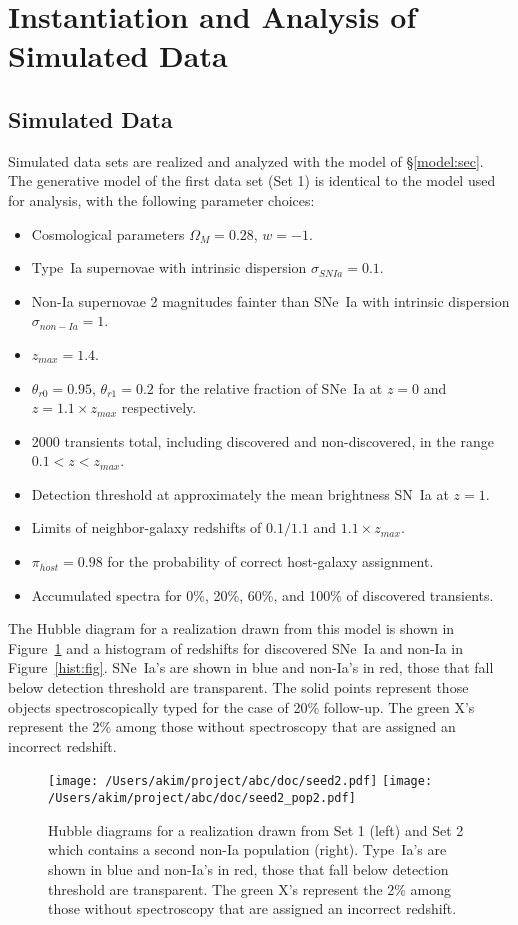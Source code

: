 \documentclass[preprint,3p]{elsarticle}
\begin{document}
\section{Instantiation and Analysis of Simulated Data}
\subsection{Simulated Data}
Simulated data sets are realized and analyzed with the model of
 \S\ref{model:sec}.  The generative model of the first data set (Set 1) is
 identical to the model used for analysis, with the following parameter choices:
\begin{itemize}
\item Cosmological parameters $\Omega_M=0.28$, $w=-1$.
\item Type~Ia supernovae with intrinsic dispersion $\sigma_{SNIa}=0.1$.
\item Non-Ia supernovae 2 magnitudes fainter than SNe~Ia with intrinsic
dispersion $\sigma_{non-Ia}=1$.
\item $z_{max}=1.4$.
\item $\theta_{r0}=0.95$, $\theta_{r1}=0.2$ for the relative fraction of SNe~Ia
at $z=0$ and $z=1.1 \times z_{max}$ respectively.
\item 2000 transients total, including discovered and non-discovered,
in the range $0.1<z<z_{max}$.
\item Detection threshold at approximately the mean brightness SN~Ia at $z=1$.
\item Limits of neighbor-galaxy redshifts of $0.1/1.1$ and $1.1\times z_{max}$.
\item $\pi_{host}=0.98$ for the probability of correct host-galaxy assignment.
\item Accumulated spectra for 0\%, 20\%, 60\%, and 100\% of discovered transients.
\end{itemize}

The Hubble diagram for a realization drawn from this model is shown in Figure~\ref{hd:fig}
and a histogram of redshifts for discovered SNe~Ia and non-Ia in Figure~\ref{hist:fig}.
SNe~Ia's are shown in blue and non-Ia's in red, those that fall below detection threshold
are transparent.  The solid points
represent those objects spectroscopically typed for the case of 20\% follow-up.
The green X's represent the 2\% among those without spectroscopy that
are assigned an incorrect redshift.

\begin{figure}[htbp] %
   \centering
   \texttt{[image: /Users/akim/project/abc/doc/seed2.pdf]}
   \texttt{[image: /Users/akim/project/abc/doc/seed2\_pop2.pdf]}  
\caption{Hubble diagrams for a realization drawn from Set 1 (left)
and Set 2 which contains  a second non-Ia population (right).
Type~Ia's are shown in blue and non-Ia's in red, those that fall below detection threshold
are transparent.  The green X's represent the 2\% among those without spectroscopy that
are assigned an incorrect redshift.
   \label{hd:fig}}
\end{figure}
\end{document}
